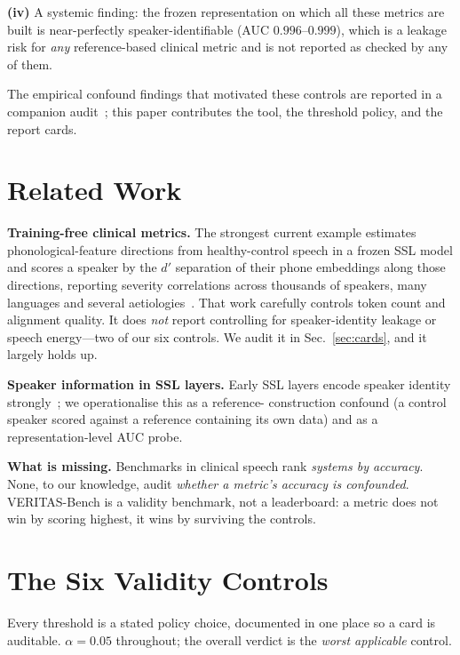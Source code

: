 \documentclass[conference]{IEEEtran}
\begin{document}
\noindent\textbf{(iv)} A systemic finding: the frozen representation on which all
these metrics are built is near-perfectly speaker-identifiable (AUC
$0.996$--$0.999$), which is a leakage risk for \emph{any} reference-based
clinical metric and is not reported as checked by any of them.

The empirical confound findings that motivated these controls are reported in a
companion audit~\cite{companion}; this paper contributes the tool, the threshold
policy, and the report cards.

\section{Related Work}
\textbf{Training-free clinical metrics.} The strongest current example estimates
phonological-feature directions from healthy-control speech in a frozen SSL model
and scores a speaker by the $d'$ separation of their phone embeddings along those
directions, reporting severity correlations across thousands of speakers, many
languages and several aetiologies~\cite{frozenssl2026a,frozenssl2026b}. That work
carefully controls token count and alignment quality. It does \emph{not} report
controlling for speaker-identity leakage or speech energy---two of our six
controls. We audit it in Sec.~\ref{sec:cards}, and it largely holds up.

\textbf{Speaker information in SSL layers.} Early SSL layers encode speaker
identity strongly~\cite{zhu2024wavrx}; we operationalise this as a reference-
construction confound (a control speaker scored against a reference containing its
own data) and as a representation-level AUC probe.

\textbf{What is missing.} Benchmarks in clinical speech rank \emph{systems by
accuracy}. None, to our knowledge, audit \emph{whether a metric's accuracy is
confounded}. VERITAS-Bench is a validity benchmark, not a leaderboard: a metric
does not win by scoring highest, it wins by surviving the controls.

\section{The Six Validity Controls}
\label{sec:controls}
Every threshold is a stated policy choice, documented in one place so a card is
auditable. $\alpha{=}0.05$ throughout; the overall verdict is the \emph{worst
applicable} control.
\end{document}

